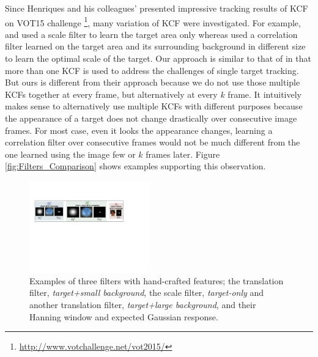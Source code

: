 \documentclass[10pt,twocolumn,letterpaper]{article}
\begin{document}
Since Henriques and his colleagues' presented impressive tracking
results of KCF \cite{henriques2015high} on VOT15
challenge \footnote{\url{http://www.votchallenge.net/vot2015/}}, many
variation of KCF were investigated. For example, \cite{ma2015long} and
\cite{danelljan2014accurate} used a scale filter to learn the target
area only whereas \cite{li2014scale, bibi2015multi, tang2015multi}
used a correlation filter learned on the target area and its
surrounding background in different size to learn the optimal scale of
the target. Our approach is similar to that of \cite{ma2015long} in
that more than one KCF is used to address the challenges of single
target tracking. But ours is different from their approach because we
do not use those multiple KCFs together at every frame, but
alternatively at every $k$ frame. It intuitively makes sense to
alternatively use multiple KCFs with different purposes because the
appearance of a target does not change drastically over consecutive
image frames. For most case, even it looks the appearance changes,
learning a correlation filter over consecutive frames would not be
much different from the one learned using the image few or $k$ frames
later. Figure \ref{fig:Filters_Comparison} shows examples supporting
this observation.
\begin{figure}[!b]
\centering
\includegraphics[width=0.47\textwidth]{./figures/Filters_Details.pdf}
\caption{Examples of three filters with hand-crafted features; the translation filter,
  \textit{target+small background}, the scale filter,
  \textit{target-only} and another translation filter,
  \textit{target+large background}, and their Hanning window and
  expected Gaussian response.}
\label{fig:Filters}
\end{figure}
\end{document}
